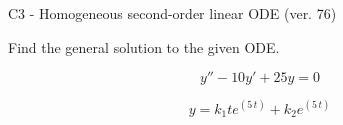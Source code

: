 \begin{exercise}
  \begin{exerciseTitle}C3 - Homogeneous second-order linear ODE (ver. 76)\end{exerciseTitle}
  \begin{exerciseStatement}
    
Find the general solution to the given ODE.

    
\[y''-10y'+25y = 0\]

  \end{exerciseStatement}
  \begin{exerciseAnswer}
    
\[y= k_{1} t e^{\left(5 \, t\right)} + k_{2} e^{\left(5 \, t\right)}\]

  \end{exerciseAnswer}
\end{exercise}